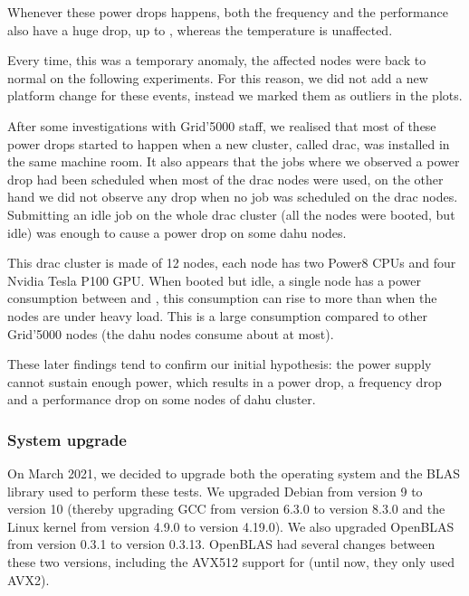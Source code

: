                 Whenever these power drops happens, both the frequency and the \dgemm performance also have a huge drop,
                up to , whereas the temperature is unaffected.

                Every time, this was a temporary anomaly, the affected nodes were back to normal on the following
                experiments. For this reason, we did not add a new platform change for these events, instead we marked
                them as outliers in the plots.

                After some investigations with Grid'5000 staff, we realised that most of these power drops started to
                happen when a new cluster, called drac, was installed in the same machine room. It also appears that the
                jobs where we observed a power drop had been scheduled when most of the drac nodes were used, on the
                other hand we did not observe any drop when no job was scheduled on the drac nodes. Submitting an idle
                job on the whole drac cluster (\ie all the nodes were booted, but idle) was enough to cause a power drop
                on some dahu nodes.

                This drac cluster is made of 12 nodes, each node has two Power8 CPUs and four Nvidia Tesla P100 GPU.
                When booted but idle, a single node has a power consumption between  and
                , this consumption can rise to more than  when the nodes are under
                heavy load. This is a large consumption compared to other Grid'5000 nodes (the dahu nodes consume about
                 at most).

                These later findings tend to confirm our initial hypothesis: the power supply cannot sustain enough
                power, which results in a power drop, a frequency drop and a performance drop on some nodes of dahu
                cluster.

            \subsubsection{System upgrade}%

                On March 2021, we decided to upgrade both the operating system and the BLAS library used to perform
                these tests. We upgraded Debian from version 9 to version 10 (thereby upgrading GCC from version 6.3.0
                to version 8.3.0 and the Linux kernel from version 4.9.0 to version 4.19.0). We also upgraded OpenBLAS
                from version 0.3.1 to version 0.3.13.  OpenBLAS had several changes between these two versions,
                including the AVX512 support for \dgemm (until now, they only used AVX2).

